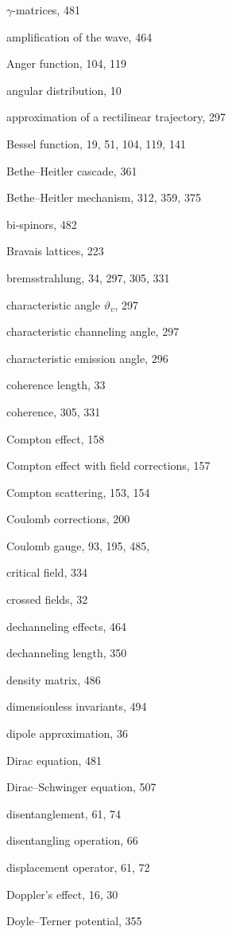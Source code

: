 
\begin{theindex}
 \item $\gamma$-matrices, 481

  \indexspace

  \item amplification of the wave, 464
  \item Anger function, 104, 119
  \item angular distribution, 10
  \item approximation of a rectilinear trajectory, 297

  \indexspace

  \item Bessel function, 19, 51, 104, 119, 141
  \item Bethe--Heitler cascade, 361
  \item Bethe--Heitler mechanism, 312, 359, 375
  \item bi-spinors, 482
  \item Bravais lattices, 223
  \item bremsstrahlung, 34, 297, 305, 331 

  \indexspace

  \item characteristic angle $\vartheta_v$, 297
  \item characteristic channeling angle, 297
  \item characteristic emission angle, 296
  \item coherence length, 33
  \item coherence, 305, 331 
  \item Compton effect, 158
  \item Compton effect with field corrections, 157
  \item Compton scattering, 153, 154
  \item Coulomb corrections, 200
  \item Coulomb gauge, 93, 195, 485,
  \item critical field, 334
  \item crossed fields, 32

  \indexspace

  \item dechanneling effects, 464
  \item dechanneling length, 350
  \item density matrix, 486
  \item dimensionless invariants, 494
  \item dipole approximation, 36
  \item Dirac equation, 481
  \item Dirac--Schwinger equation, 507
  \item disentanglement, 61, 74
  \item disentangling operation, 66
  \item displacement operator, 61, 72
  \item Doppler's effect, 16, 30
  \item Doyle--Terner potential, 355


\end{theindex}
